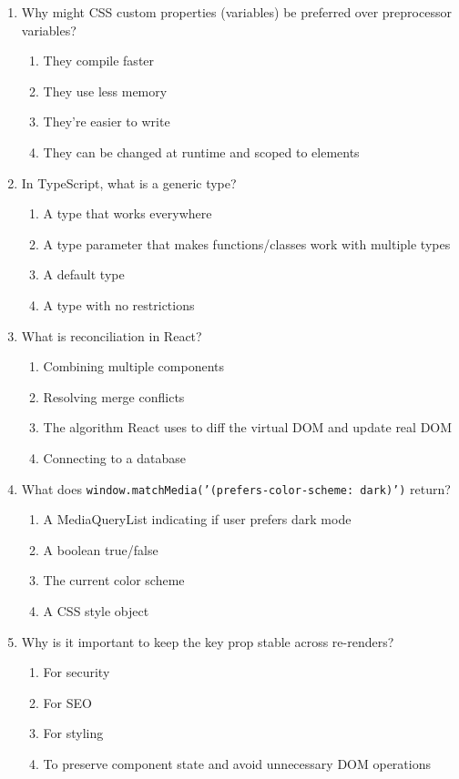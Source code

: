 \documentclass[12pt,a4paper]{article}
\begin{document}
\begin{enumerate}
\item Why might CSS custom properties (variables) be preferred over preprocessor variables?
\begin{enumerate}[label=\Alph*)]
    \item They compile faster
    \item They use less memory
    \item They're easier to write
    \item They can be changed at runtime and scoped to elements
\end{enumerate}

\item In TypeScript, what is a generic type?
\begin{enumerate}[label=\Alph*)]
    \item A type that works everywhere
    \item A type parameter that makes functions/classes work with multiple types
    \item A default type
    \item A type with no restrictions
\end{enumerate}

\item What is reconciliation in React?
\begin{enumerate}[label=\Alph*)]
    \item Combining multiple components
    \item Resolving merge conflicts
    \item The algorithm React uses to diff the virtual DOM and update real DOM
    \item Connecting to a database
\end{enumerate}

\item What does \texttt{window.matchMedia('(prefers-color-scheme: dark)')} return?
\begin{enumerate}[label=\Alph*)]
    \item A MediaQueryList indicating if user prefers dark mode
    \item A boolean true/false
    \item The current color scheme
    \item A CSS style object
\end{enumerate}

\item Why is it important to keep the key prop stable across re-renders?
\begin{enumerate}[label=\Alph*)]
    \item For security
    \item For SEO
    \item For styling
    \item To preserve component state and avoid unnecessary DOM operations
\end{enumerate}


\end{enumerate}
\end{document}
